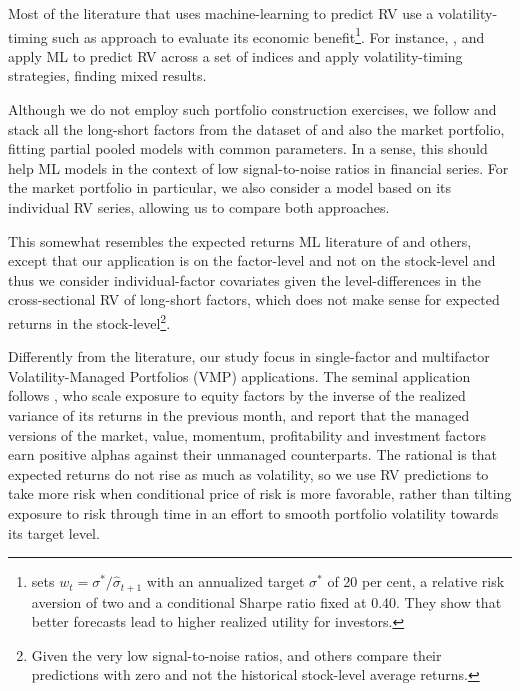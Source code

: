 \documentclass[preprint,12pt,authoryear]{elsarticle}
\begin{document}
Most of the literature that uses machine-learning to predict RV use a volatility-timing such as \citet{bollerslevhoodhusspedersen2018} approach to evaluate its economic benefit\footnote{\citet{bollerslevhoodhusspedersen2018} sets $w_t = \sigma^{*} / \hat{\sigma}_{t+1}$ with an annualized target $\sigma^{*}$ of 20 per cent, a relative risk aversion of two and a conditional Sharpe ratio fixed at 0.40. They show that better forecasts lead to higher realized utility for investors.}. For instance, \citet{brancorubesamzevallos2024}, \citet{diazhansencabrera2024} and  \citet{chunchoryu2025} apply ML to predict RV across a set of indices and apply volatility-timing strategies, finding mixed results.

Although we do not employ such portfolio construction exercises, we follow \citet{bollerslevhoodhusspedersen2018} and stack all the long-short factors from the dataset of \citet{jensenkellypedersen2023} and also the market portfolio, fitting partial pooled models with common parameters. In a sense, this should help ML models in the context of low signal-to-noise ratios in financial series. For the market portfolio in particular, we also consider a model based on its individual RV series, allowing us to compare both approaches. 

This somewhat resembles the expected returns ML literature of \citet{gukellyxiu2020} and others, except that our application is on the factor-level and not on the stock-level and thus we consider individual-factor covariates given the level-differences in the cross-sectional RV of long-short factors, which does not make sense for expected returns in the stock-level\footnote{Given the very low signal-to-noise ratios, \citet{gukellyxiu2020} and others compare their predictions with zero and not the historical stock-level average returns.}.

Differently from the literature, our study focus in single-factor and multifactor Volatility-Managed Portfolios (VMP) applications. The seminal application follows \citet{moreiramuir2017}, who scale exposure to equity factors by the inverse of the realized variance of its returns in the previous month, and report that the
managed versions of the market, value, momentum, profitability and investment factors earn positive alphas against their unmanaged counterparts. The rational is that expected returns do not rise as much as volatility, so we use RV predictions to take more risk when conditional price of risk is more favorable, rather than tilting exposure to risk through time in an effort to smooth portfolio volatility towards its target level.
\end{document}
